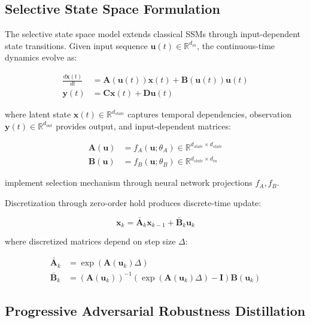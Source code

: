 \subsection{Selective State Space Formulation}

The selective state space model extends classical SSMs through input-dependent state transitions. Given input sequence $\mathbf{u}(t) \in \mathbb{R}^{d_{in}}$, the continuous-time dynamics evolve as:

\begin{align}
\frac{d\mathbf{x}(t)}{dt} &= \mathbf{A}(\mathbf{u}(t)) \mathbf{x}(t) + \mathbf{B}(\mathbf{u}(t)) \mathbf{u}(t) \\
\mathbf{y}(t) &= \mathbf{C} \mathbf{x}(t) + \mathbf{D} \mathbf{u}(t)
\end{align}

where latent state $\mathbf{x}(t) \in \mathbb{R}^{d_{state}}$ captures temporal dependencies, observation $\mathbf{y}(t) \in \mathbb{R}^{d_{out}}$ provides output, and input-dependent matrices:

\begin{align}
\mathbf{A}(\mathbf{u}) &= f_A(\mathbf{u}; \theta_A) \in \mathbb{R}^{d_{state} \times d_{state}} \\
\mathbf{B}(\mathbf{u}) &= f_B(\mathbf{u}; \theta_B) \in \mathbb{R}^{d_{state} \times d_{in}}
\end{align}

implement selection mechanism through neural network projections $f_A, f_B$.

Discretization through zero-order hold produces discrete-time update:

\begin{equation}
\mathbf{x}_k = \bar{\mathbf{A}}_k \mathbf{x}_{k-1} + \bar{\mathbf{B}}_k \mathbf{u}_k
\end{equation}

where discretized matrices depend on step size $\Delta$:

\begin{align}
\bar{\mathbf{A}}_k &= \exp(\mathbf{A}(\mathbf{u}_k) \Delta) \\
\bar{\mathbf{B}}_k &= (\mathbf{A}(\mathbf{u}_k))^{-1}(\exp(\mathbf{A}(\mathbf{u}_k)\Delta) - \mathbf{I})\mathbf{B}(\mathbf{u}_k)
\end{align}

\subsection{Progressive Adversarial Robustness Distillation}

